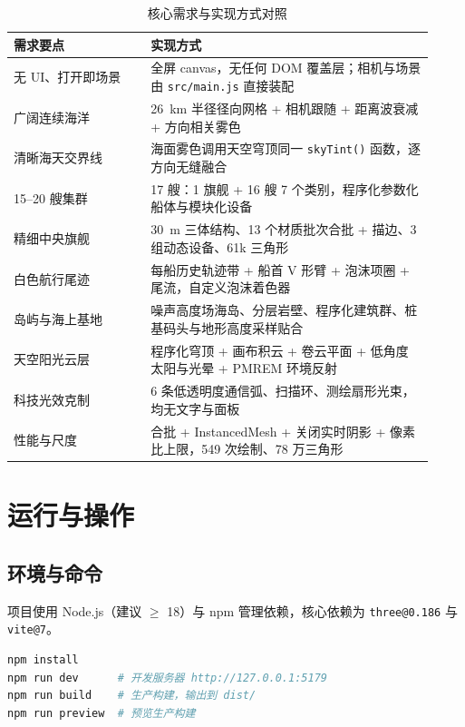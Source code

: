\documentclass[UTF8, a4paper, 11pt]{ctexart}
\newcommand{\file}[1]{\texttt{#1}}
\begin{document}
\begin{table}[H]
\centering
\caption{核心需求与实现方式对照}
\label{tab:req-map}
\small
\begin{tabular}{@{}p{0.30\linewidth}p{0.62\linewidth}@{}}
\toprule
\textbf{需求要点} & \textbf{实现方式} \\
\midrule
无 UI、打开即场景 & 全屏 canvas，无任何 DOM 覆盖层；相机与场景由 \file{src/main.js} 直接装配 \\
广阔连续海洋 & 26~km 半径径向网格 + 相机跟随 + 距离波衰减 + 方向相关雾色 \\
清晰海天交界线 & 海面雾色调用天空穹顶同一 \texttt{skyTint()} 函数，逐方向无缝融合 \\
15--20 艘集群 & 17 艘：1 旗舰 + 16 艘 7 个类别，程序化参数化船体与模块化设备 \\
精细中央旗舰 & 30~m 三体结构、13 个材质批次合批 + 描边、3 组动态设备、61k 三角形 \\
白色航行尾迹 & 每船历史轨迹带 + 船首 V 形臂 + 泡沫项圈 + 尾流，自定义泡沫着色器 \\
岛屿与海上基地 & 噪声高度场海岛、分层岩壁、程序化建筑群、桩基码头与地形高度采样贴合 \\
天空阳光云层 & 程序化穹顶 + 画布积云 + 卷云平面 + 低角度太阳与光晕 + PMREM 环境反射 \\
科技光效克制 & 6 条低透明度通信弧、扫描环、测绘扇形光束，均无文字与面板 \\
性能与尺度 & 合批 + InstancedMesh + 关闭实时阴影 + 像素比上限，549 次绘制、78 万三角形 \\
\bottomrule
\end{tabular}
\end{table}

\section{运行与操作}

\subsection{环境与命令}

项目使用 Node.js（建议 $\ge$ 18）与 npm 管理依赖，核心依赖为 \file{three@0.186} 与 \file{vite@7}。

\begin{lstlisting}[language=bash, caption={安装与运行命令}, label={lst:run}]
npm install
npm run dev      # 开发服务器 http://127.0.0.1:5179
npm run build    # 生产构建，输出到 dist/
npm run preview  # 预览生产构建
\end{lstlisting}
\end{document}
